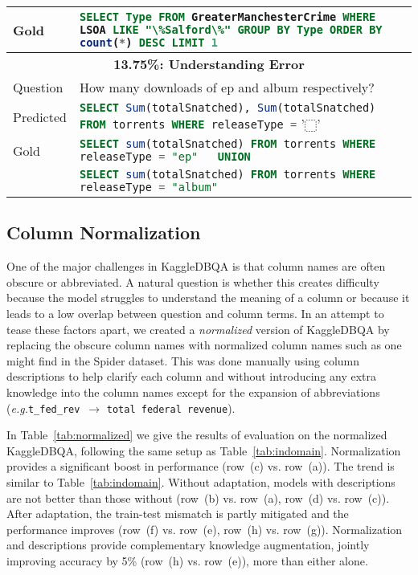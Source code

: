 \documentclass[11pt,a4paper]{article}
\newcommand{\systemname}{\mbox{KaggleDBQA}\xspace}
\newcommand{\eg}{\textit{e.g.}\xspace}
\newcommand{\sql}[1]{\lstinline[language=SQL, basicstyle=\footnotesize\ttfamily]{#1}}
\begin{document}
\begin{table*}[t]
\begin{tabular}{lp{14.2cm}}
        Gold &  \sql{SELECT Type FROM GreaterManchesterCrime WHERE LSOA LIKE "\%Salford\%" GROUP BY Type ORDER BY count(*) DESC LIMIT 1} \\
        \midrule
        \multicolumn{2}{c}{\bfseries 13.75\%:  Understanding Error} \\
        Question  & How many downloads of ep and album respectively? \\
        Predicted &  \sql{SELECT Sum(totalSnatched), Sum(totalSnatched) FROM torrents WHERE releaseType =} '$\dottedsquare$' \\
        Gold &   \sql{SELECT sum(totalSnatched) FROM torrents WHERE releaseType = "ep"   UNION} \\
        & \sql{SELECT sum(totalSnatched) FROM torrents WHERE releaseType = "album"}\\
        \bottomrule
\end{tabular}
\end{table*}

\subsection{Column Normalization}
One of the major challenges in \systemname is that column names are often obscure or abbreviated. A natural question is whether this creates difficulty because the model struggles to understand the meaning of a column or because it leads to a low overlap between question and column terms. In an attempt to tease these factors apart, we created a \textit{normalized} version of \systemname by replacing the obscure column names with normalized column names such as one might find in the Spider dataset. This was done manually using column descriptions to help clarify each column and without introducing any extra knowledge into the column names except for the expansion of abbreviations (\eg \texttt{t\_fed\_rev}~$\to$ \texttt{total federal revenue}). 




In Table~\ref{tab:normalized} we give the results of evaluation on the normalized \systemname, following the same setup as Table~\ref{tab:indomain}. Normalization provides a significant boost in performance (row~(c) vs. row~(a)).
The trend is similar to Table~\ref{tab:indomain}. Without adaptation, models with descriptions are not better than those without (row~(b) vs. row~(a), row~(d) vs. row~(c)). After adaptation, the train-test mismatch is partly mitigated and the performance improves (row~(f) vs. row~(e), row~(h) vs. row~(g)). Normalization and descriptions provide complementary knowledge augmentation, jointly improving accuracy by 5\% (row~(h) vs. row~(e)), more than either alone.
\end{document}

